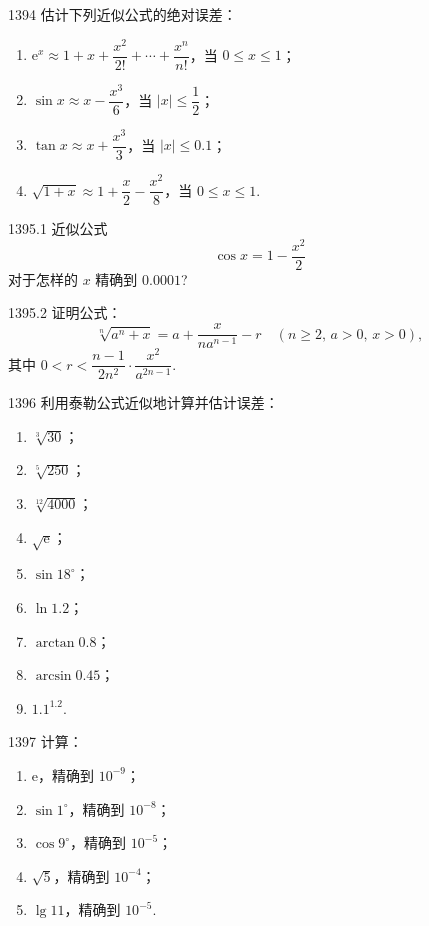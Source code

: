 \begin{prob}[L]{1394}
估计下列近似公式的绝对误差：
\begin{enumerate}[label=(\alph*), itemsep=2pt, topsep=3pt]
    \item $\mathrm{e}^x \approx 1 + x + \dfrac{x^2}{2!} + \cdots + \dfrac{x^n}{n!}$，当 $0 \leqslant x \leqslant 1$；
    \item $\sin x \approx x - \dfrac{x^3}{6}$，当 $|x| \leqslant \dfrac{1}{2}$；
    \item $\tan x \approx x + \dfrac{x^3}{3}$，当 $|x| \leqslant 0.1$；
    \item $\sqrt{1 + x} \approx 1 + \dfrac{x}{2} - \dfrac{x^2}{8}$，当 $0 \leqslant x \leqslant 1$.
\end{enumerate}
\end{prob}

\begin{prob}[M]{1395.1}
近似公式
\[
\cos x = 1 - \frac{x^2}{2}
\]
对于怎样的 $x$ 精确到 $0.0001$?
\end{prob}

\begin{prob}[M]{1395.2}
证明公式：
\[
\sqrt[n]{a^n + x} = a + \frac{x}{na^{n-1}} - r \quad (n \geqslant 2, \, a > 0, \, x > 0),
\]
其中 $0 < r < \dfrac{n - 1}{2n^2} \cdot \dfrac{x^2}{a^{2n - 1}}$.
\end{prob}

\begin{prob}[L]{1396}
利用泰勒公式近似地计算并估计误差：
\begin{enumerate}[label=(\alph*), itemsep=2pt, topsep=3pt]
    \item $\sqrt[3]{30}$；
    \item $\sqrt[5]{250}$；
    \item $\sqrt[12]{4000}$；
    \item $\sqrt{\mathrm{e}}$；
    \item $\sin 18^\circ$；
    \item $\ln 1.2$；
    \item $\arctan 0.8$；
    \item $\arcsin 0.45$；
    \item $1.1^{1.2}$.
\end{enumerate}
\end{prob}

\begin{prob}[L]{1397}
计算：
\begin{enumerate}[label=(\alph*), itemsep=2pt, topsep=3pt]
    \item $\mathrm{e}$，精确到 $10^{-9}$；
    \item $\sin 1^\circ$，精确到 $10^{-8}$；
    \item $\cos 9^\circ$，精确到 $10^{-5}$；
    \item $\sqrt{5}$，精确到 $10^{-4}$；
    \item $\lg 11$，精确到 $10^{-5}$.
\end{enumerate}
\end{prob}

